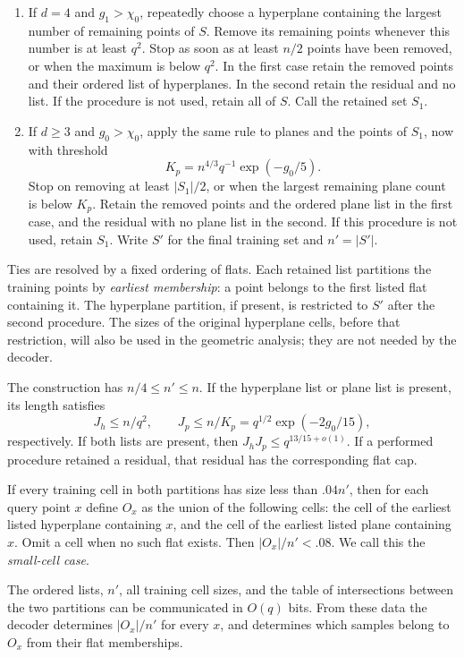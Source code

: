 \begin{enumerate}
\item If \(d=4\) and \(g_1>\chi_0\), repeatedly choose a hyperplane
containing the largest number of remaining points of \(S\).
Remove its remaining points whenever this number is at least \(q^2\).
Stop as soon as at least \(n/2\) points have been removed, or when
the maximum is below \(q^2\).
In the first case retain the removed points and their ordered list
of hyperplanes. In the second retain the residual and no list.
If the procedure is not used, retain all of \(S\).
Call the retained set \(S_1\).
\item If \(d\ge3\) and \(g_0>\chi_0\), apply the same rule to planes
and the points of \(S_1\), now with threshold
\[
 K_p=n^{4/3}q^{-1}\exp(-g_0/5).
\]
Stop on removing at least \(|S_1|/2\), or when the largest
remaining plane count is below \(K_p\).
Retain the removed points and the ordered plane list in the first
case, and the residual with no plane list in the second.
If this procedure is not used, retain \(S_1\).
Write \(S'\) for the final training set and \(n'=|S'|\).
\end{enumerate}

Ties are resolved by a fixed ordering of flats. Each retained list
partitions the training points by \emph{earliest membership}:
a point belongs to the first listed flat containing it. The
hyperplane partition, if present, is restricted to \(S'\) after
the second procedure. The sizes of the original hyperplane
cells, before that restriction, will also be used in the
geometric analysis; they are not needed by the decoder.

\begin{lemma}
\label{lem:training}
The construction has \(n/4\le n'\le n\).
If the hyperplane list or plane list is present, its length satisfies
\[
 J_h\le n/q^2,\qquad
 J_p\le n/K_p=q^{1/2}\exp(-2g_0/15),
\]
respectively. If both lists are present, then
\(J_hJ_p\le q^{13/15+o(1)}\).
If a performed procedure retained a residual, that residual has
the corresponding flat cap.

If every training cell in both partitions has size less than
\(.04n'\), then for each query point \(x\) define \(O_x\) as the
union of the following cells: the cell of the earliest listed
hyperplane containing \(x\), and the cell of the earliest listed
plane containing \(x\). Omit a cell when no such flat exists.
Then \(|O_x|/n'<.08\). We call this the \emph{small-cell case}.

The ordered lists, \(n'\), all training cell sizes, and the table
of intersections between the two partitions can be communicated
in \(O(q)\) bits. From these data the decoder determines
\(|O_x|/n'\) for every \(x\), and determines which samples belong
to \(O_x\) from their flat memberships.
\end{lemma}

